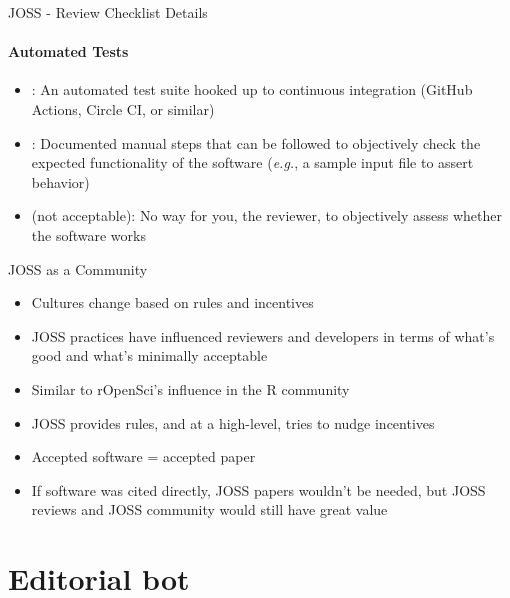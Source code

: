 \begin{frame}{JOSS - Review Checklist Details}
\framesubtitle{Automated Tests}

\begin{itemize}
        \item {}: An automated test suite hooked up to
continuous integration (GitHub Actions, Circle CI,
or similar)
\item {}: Documented manual steps that can be
followed to objectively check the expected
functionality of the software (\emph{e.g.}, a sample input
file to assert behavior)
\item {} (not acceptable):  No way for you, the
reviewer, to objectively assess whether the
software works
\end{itemize}
    
\end{frame}

\begin{frame}{JOSS as a Community}
    \begin{itemize}
        \item Cultures change based on rules and incentives
        \item JOSS practices have influenced reviewers and
developers in terms of what's good and what's
minimally acceptable
\item Similar to rOpenSci's influence in the R community
\item JOSS provides rules, and at a high-level, tries to
nudge incentives
\item Accepted software = accepted paper
\item If software was cited directly, JOSS papers wouldn't
be needed, but JOSS reviews and JOSS
community would still have great value
    \end{itemize}
\end{frame}

\section{Editorial bot}

